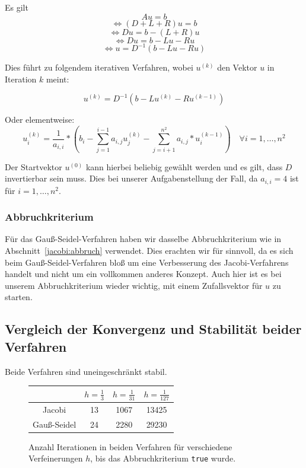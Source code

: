 \documentclass{article}
\begin{document}
Es gilt
$$Au = b$$
$$\Leftrightarrow (D+L+R)u = b$$
$$\Leftrightarrow Du = b - (L+R)u$$
$$\Leftrightarrow Du= b - Lu - Ru$$
$$\Leftrightarrow u = D^{-1} (b - Lu - Ru)$$

Dies führt zu folgendem iterativen Verfahren, wobei $u^{(k)}$ den Vektor $u$ in Iteration $k$ meint:

$$u^{(k)} = D^{-1} \left(b - Lu^{(k)} - Ru^{(k-1)}\right)$$

Oder elementweise:
$$u_i^{(k)} = \frac{1}{a_{i,i}} * \left(b_i - \sum_{j=1}^{i-1}{a_{i,j} u_j^{(k)}} - \sum_{j=i+1}^{n^2}{a_{i,j}*u_i^{(k-1)}}\right) \quad \forall i = 1, \ldots, n^2$$

Der Startvektor $u^{(0)}$ kann hierbei beliebig gewählt werden und es gilt, dass $D$ invertierbar sein muss. Dies bei unserer Aufgabenstellung der Fall, da $a_{i,i} = 4$ ist für $i = 1, \ldots, n^2$.



\subsubsection{Abbruchkriterium}
Für das Gauß-Seidel-Verfahren haben wir dasselbe Abbruchkriterium wie in Abschnitt~\ref{jacobi:abbruch} verwendet. Dies erachten wir für sinnvoll, da es sich beim Gauß-Seidel-Verfahren bloß um eine Verbesserung des Jacobi-Verfahrens handelt und nicht um ein vollkommen anderes Konzept. Auch hier ist es bei unserem Abbruchkriterium wieder wichtig, mit einem Zufallsvektor für $u$ zu starten.

\subsection{Vergleich der Konvergenz und Stabilität beider Verfahren}\label{konvergenz}
Beide Verfahren sind uneingeschränkt stabil.
\begin{figure}[htbp] 
  \centering

  \begin{tabular}{|c|c|c|c|}
    \hline 
     & $h=\frac{1}{3}$ & $h=\frac{1}{31}$ & $h = \frac{1}{127}$ \\ 
    \hline 
    Jacobi & 13 & 1067 & 13425 \\ 
    \hline 
    Gauß-Seidel & 24 & 2280 & 29230 \\ 
    \hline 
    \end{tabular}   
  
  \caption{Anzahl Iterationen in beiden Verfahren für verschiedene Verfeinerungen $h$, bis das Abbruchkriterium \texttt{true} wurde.}
  \label{fig:Bild1}
\end{figure}
\end{document}
